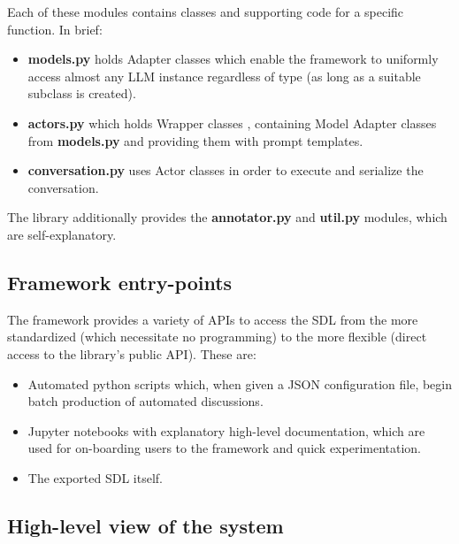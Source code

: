 Each of these modules contains classes and supporting code for a specific function. In brief:

\begin{itemize}
	\item \textbf{models.py} holds Adapter classes \cite{gamma1995design} which enable the framework to uniformly access almost any LLM instance regardless of type (as long as a suitable subclass is created).
	
	\item \textbf{actors.py} which holds Wrapper classes \cite{gamma1995design}, containing Model Adapter classes from \textbf{models.py} and providing them with prompt templates.
	
	\item \textbf{conversation.py} uses Actor classes in order to execute and serialize the conversation.
\end{itemize}

The library additionally provides the \textbf{annotator.py} and \textbf{util.py} modules, which are self-explanatory.


\subsection{Framework entry-points}
\label{ssec:system:entrypoints}

The framework provides a variety of \acp{API} to access the \ac{SDL} from the more standardized (which necessitate no programming) to the more flexible (direct access to the library's public \ac{API}). These are:

\begin{itemize}
	\item Automated python scripts which, when given a \ac{JSON} configuration file, begin batch production of automated discussions.
	
	\item Jupyter notebooks with explanatory high-level documentation, which are used for on-boarding users to the framework and quick experimentation.
	
	\item The exported \ac{SDL} itself.
\end{itemize}


\subsection{High-level view of the system}
\label{ssec:system:overview}

